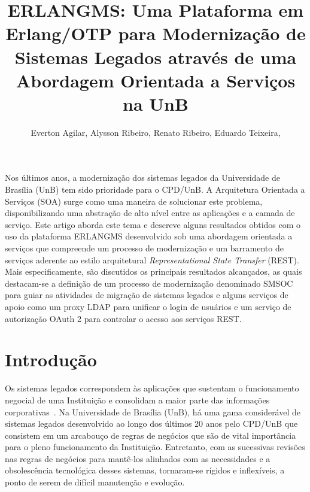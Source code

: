 \documentclass[12pt]{article}
\title{ERLANGMS: Uma Plataforma em Erlang/OTP para 
Modernização de Sistemas Legados através de uma Abordagem Orientada a Serviços na UnB}
\author{
	Everton Agilar\inst{1},
	Alysson Ribeiro\inst{1},
	Renato Ribeiro\inst{1},
	Eduardo Teixeira\inst{1},
}
\begin{document}
 

\maketitle


     
\begin{resumo} 
Nos últimos anos, a modernização dos sistemas legados da Universidade de Brasília (UnB) tem sido 
prioridade para o CPD/UnB. 
A Arquitetura Orientada a Serviços (SOA) surge como uma maneira de solucionar 
este problema, disponibilizando uma abstração de alto nível entre as aplicações e a camada de serviço.
Este artigo aborda este tema e descreve alguns resultados obtidos com o uso 
da plataforma ERLANGMS desenvolvido sob 
uma abordagem orientada a serviços que compreende um processo 
de moderniza\c c\~{a}o e um barramento de serviços aderente ao estilo 
arquitetural \textit{Representational State Transfer} (REST). 
Mais especificamente, são discutidos os principais resultados alcançados, 
as quais destacam-se a definição de um processo de modernização denominado SMSOC 
para guiar as atividades de 
migração de sistemas legados 
e alguns serviços de apoio 
como um proxy LDAP para unificar o login de usuários e 
um serviço de autorização OAuth 2
para controlar o acesso aos serviços REST.
\end{resumo}


\section{Introdução}

Os sistemas legados correspondem às aplicações que sustentam o funcionamento 
negocial de uma Instituição e consolidam a maior parte das informações corporativas~\cite{S4_bennett1995legacy}. 
Na Universidade de Brasília (UnB), há uma gama considerável de sistemas legados desenvolvido 
ao longo dos últimos 20 anos pelo CPD/UnB que consistem em um arcabouço 
de regras de negócios que são de vital importância para o 
pleno funcionamento da Instituição. Entretanto, com as 
sucessivas revisões nas regras de negócios para mantê-los alinhados
com as necessidades e a obsolescência tecnológica desses sistemas, 
tornaram-se rígidos e inflexíveis, a ponto de serem de difícil manutenção e evolução. 
\end{document}
